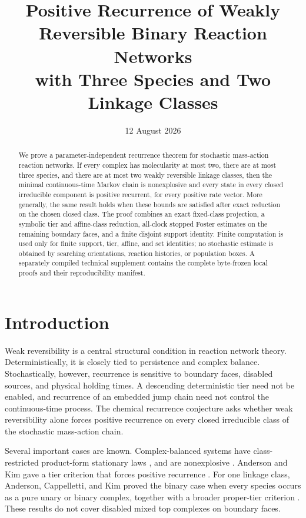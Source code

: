 \documentclass[11pt]{article}
\title{Positive Recurrence of Weakly Reversible Binary Reaction Networks\\
with Three Species and Two Linkage Classes}
\author{}
\date{12 August 2026}
\theoremstyle{definition}
\theoremstyle{remark}
\newcommand{\1}{\mathbf 1}
\begin{document}
\maketitle

\begin{abstract}
We prove a parameter-independent recurrence theorem for stochastic
mass-action reaction networks.  If every complex has molecularity at most
two, there are at most three species, and there are at most two weakly
reversible linkage classes, then the minimal continuous-time Markov chain is
nonexplosive and every state in every closed irreducible component is positive
recurrent, for every positive rate vector.  More generally, the same result
holds when these bounds are satisfied after exact reduction on the chosen
closed class.  The proof combines an exact fixed-class projection, a symbolic
tier and affine-class reduction, all-clock stopped Foster estimates on the
remaining boundary faces, and a finite disjoint support identity.  Finite
computation is used only for finite support, tier, affine, and set identities;
no stochastic estimate is obtained by searching orientations, reaction
histories, or population boxes.  A separately compiled technical supplement
contains the complete byte-frozen local proofs and their reproducibility
manifest.
\end{abstract}

\section{Introduction}

Weak reversibility is a central structural condition in reaction network
theory.  Deterministically, it is closely tied to persistence and complex
balance.  Stochastically, however, recurrence is sensitive to boundary faces,
disabled sources, and physical holding times.  A descending deterministic
tier need not be enabled, and recurrence of an embedded jump chain need not
control the continuous-time process.  The chemical recurrence conjecture asks
whether weak reversibility alone forces positive recurrence on every closed
irreducible class of the stochastic mass-action chain.

Several important cases are known.  Complex-balanced systems have
class-restricted product-form stationary laws
\cite{AndersonCraciunKurtz2010}, and are nonexplosive
\cite{AndersonCappellettiKoyamaKurtz2018}.  Anderson and Kim gave a tier
criterion that forces positive recurrence \cite[Theorem~9]{AndersonKim2018}.
For one linkage class, Anderson, Cappelletti, and Kim proved the binary case
when every species occurs as a pure unary or binary complex, together with a
broader proper-tier criterion \cite{AndersonCappellettiKim2020}.  These
results do not cover disabled mixed top complexes on boundary faces.
\end{document}
